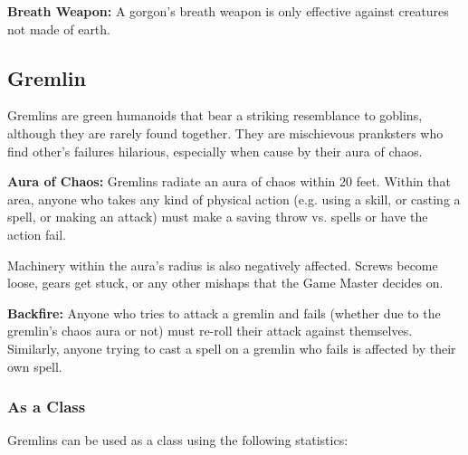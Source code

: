\begin{multicols*}{2}
\textbf{Breath Weapon:} A gorgon's breath weapon is only effective against creatures not made of earth.

\subsection{Gremlin}

Gremlins are green humanoids that bear a striking resemblance to goblins, although they are rarely found together. They are mischievous pranksters who find other's failures hilarious, especially when cause by their aura of chaos.

\textbf{Aura of Chaos:} Gremlins radiate an aura of chaos within 20 feet. Within that area, anyone who takes any kind of physical action (e.g. using a skill, or casting a spell, or making an attack) must make a saving throw vs. spells or have the action fail.

Machinery within the aura's radius is also negatively affected. Screws become loose, gears get stuck, or any other mishaps that the Game Master decides on.

\textbf{Backfire:} Anyone who tries to attack a gremlin and fails (whether due to the gremlin’s chaos aura or not) must re-roll their attack against themselves. Similarly, anyone trying to cast a spell on a gremlin who fails is affected by their own spell.

\subsubsection{As a Class}
Gremlins can be used as a class using the following statistics:


\end{multicols*}
